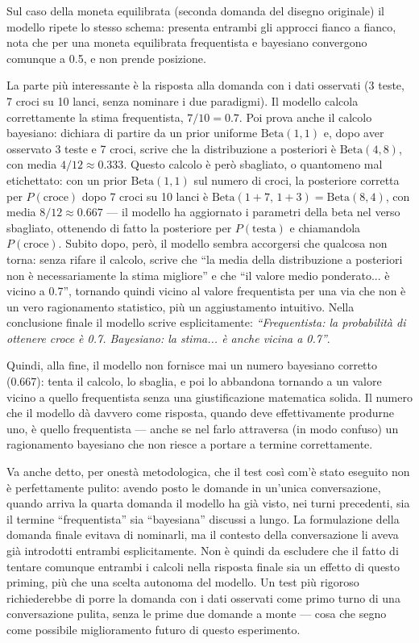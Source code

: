 Sul caso della moneta equilibrata (seconda domanda del disegno originale) il modello ripete lo stesso schema: presenta entrambi gli approcci fianco a fianco, nota che per una moneta equilibrata frequentista e bayesiano convergono comunque a 0.5, e non prende posizione.

La parte più interessante è la risposta alla domanda con i dati osservati (3 teste, 7 croci su 10 lanci, senza nominare i due paradigmi). Il modello calcola correttamente la stima frequentista, $7/10 = 0.7$. Poi prova anche il calcolo bayesiano: dichiara di partire da un prior uniforme $\mathrm{Beta}(1,1)$ e, dopo aver osservato 3 teste e 7 croci, scrive che la distribuzione a posteriori è $\mathrm{Beta}(4,8)$, con media $4/12 \approx 0.333$. Questo calcolo è però sbagliato, o quantomeno mal etichettato: con un prior $\mathrm{Beta}(1,1)$ sul numero di croci, la posteriore corretta per $P(\text{croce})$ dopo 7 croci su 10 lanci è $\mathrm{Beta}(1+7,\,1+3) = \mathrm{Beta}(8,4)$, con media $8/12 \approx 0.667$ --- il modello ha aggiornato i parametri della beta nel verso sbagliato, ottenendo di fatto la posteriore per $P(\text{testa})$ e chiamandola $P(\text{croce})$. Subito dopo, però, il modello sembra accorgersi che qualcosa non torna: senza rifare il calcolo, scrive che ``la media della distribuzione a posteriori non è necessariamente la stima migliore'' e che ``il valore medio ponderato... è vicino a 0.7'', tornando quindi vicino al valore frequentista per una via che non è un vero ragionamento statistico, più un aggiustamento intuitivo. Nella conclusione finale il modello scrive esplicitamente: \emph{``Frequentista: la probabilità di ottenere croce è 0.7. Bayesiano: la stima... è anche vicina a 0.7''}.

Quindi, alla fine, il modello non fornisce mai un numero bayesiano corretto (0.667): tenta il calcolo, lo sbaglia, e poi lo abbandona tornando a un valore vicino a quello frequentista senza una giustificazione matematica solida. Il numero che il modello dà davvero come risposta, quando deve effettivamente produrne uno, è quello frequentista --- anche se nel farlo attraversa (in modo confuso) un ragionamento bayesiano che non riesce a portare a termine correttamente.

Va anche detto, per onestà metodologica, che il test così com'è stato eseguito non è perfettamente pulito: avendo posto le domande in un'unica conversazione, quando arriva la quarta domanda il modello ha già visto, nei turni precedenti, sia il termine ``frequentista'' sia ``bayesiana'' discussi a lungo. La formulazione della domanda finale evitava di nominarli, ma il contesto della conversazione li aveva già introdotti entrambi esplicitamente. Non è quindi da escludere che il fatto di tentare comunque entrambi i calcoli nella risposta finale sia un effetto di questo priming, più che una scelta autonoma del modello. Un test più rigoroso richiederebbe di porre la domanda con i dati osservati come primo turno di una conversazione pulita, senza le prime due domande a monte --- cosa che segno come possibile miglioramento futuro di questo esperimento.

